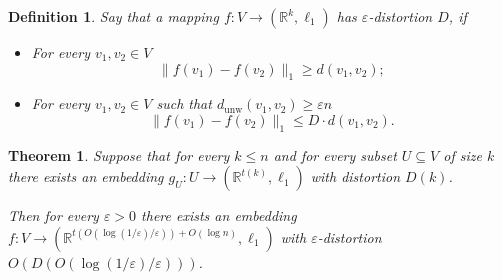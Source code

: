 \documentclass[12pt]{article}
\newcommand{\dunw}{d_{\mathrm{unw}}}
\newcommand{\eps}{\varepsilon}
\newtheorem{definition}{Definition}
\newtheorem{theorem}{Theorem}
\begin{document}
    \begin{definition}
        Say that a mapping $f \colon V \to (\mathbb{R}^k, \ell_1)$ has $\eps$-distortion $D$, if 
        \begin{itemize}
            \item For every $v_1, v_2 \in V$
            $$
                \|f(v_1) - f(v_2)\|_1 \geq d(v_1, v_2); 
            $$
            \item For every $v_1, v_2 \in V$ such that $\dunw(v_1, v_2) \geq \eps n$
            $$
                \|f(v_1) - f(v_2)\|_1 \leq D \cdot d(v_1, v_2).
            $$
        \end{itemize}
    \end{definition}

    \begin{theorem}
        \label{black_box}
        Suppose that for every $k \leq n$ and for every subset $U \subseteq V$ of size $k$ there exists an embedding 
        $g_U \colon U \to (\mathbb{R}^{t(k)}, \ell_1)$ with distortion $D(k)$.

        Then for every $\eps > 0$ there exists an embedding $f \colon V \to (\mathbb{R}^{t(O(\log(1 / \eps) / \eps)) + O(\log n)}, \ell_1)$ with $\eps$-distortion
        $O(D(O(\log(1 / \eps) / \eps)))$.
    \end{theorem}
\end{document}
